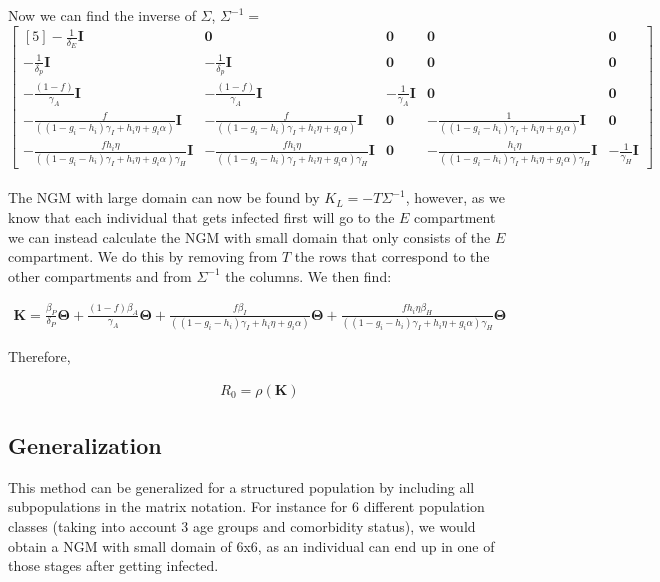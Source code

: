 \documentclass{article}
\begin{document}
Now we can find the inverse of $\Sigma$, $\Sigma^{-1} = $
\\
\noindent
\[
  \begin{bmatrix*} [5] 
   - \frac{1}{\delta_E} \boldsymbol{I} & \boldsymbol{0} & \boldsymbol{0} & \boldsymbol{0} & \boldsymbol{0} \\
   -\frac{1}{\delta_p} \boldsymbol{I} & -\frac{1}{\delta_p} \boldsymbol{I} & \boldsymbol{0} & \boldsymbol{0} & \boldsymbol{0} \\
   -\frac{(1-f)}{\gamma_A} \boldsymbol{I} & -\frac{(1-f)}{\gamma_A} \boldsymbol{I} & -\frac{1}{\gamma_A} \boldsymbol{I} & \boldsymbol{0} & \boldsymbol{0} \\
   -\frac{f}{((1-g_i-h_i) \gamma_{I} + h_i \eta + g_i \alpha)} \boldsymbol{I} & -\frac{f}{((1-g_i-h_i) \gamma_{I} + h_i \eta + g_i \alpha)} \boldsymbol{I} & \boldsymbol{0} & -\frac{1}{((1-g_i-h_i) \gamma_{I} + h_i \eta + g_i \alpha)} \boldsymbol{I} & \boldsymbol{0} \\
   -\frac{fh_i \eta}{((1-g_i-h_i) \gamma_{I} + h_i \eta + g_i \alpha)\gamma_H} \boldsymbol{I} & -\frac{fh_i \eta}{((1-g_i-h_i) \gamma_{I} + h_i \eta + g_i \alpha)\gamma_H} \boldsymbol{I} & \boldsymbol{0} & -\frac{h_i \eta}{((1-g_i-h_i) \gamma_{I} + h_i \eta + g_i \alpha)\gamma_H} \boldsymbol{I} & -\frac{1}{\gamma_H} \boldsymbol{I} 
   \end{bmatrix*}
\]
\\
The NGM with large domain can now be found by $K_L = - T \Sigma^{-1}$, however, as we know that each individual that gets infected first will go to the $E$ compartment we can instead calculate the NGM with small domain that only consists of the $E$ compartment.
We do this by removing from $T$ the rows that correspond to the other compartments and from $\Sigma^{-1}$ the columns. 
We then find: 

\begin{gather}
\boldsymbol{K} = \frac{\beta_P}{\delta_P} \boldsymbol{\Theta} + \frac{(1-f)\beta_A}{\gamma_A} \boldsymbol{\Theta} + \frac{f \beta_I}{((1-g_i-h_i) \gamma_{I} + h_i \eta + g_i \alpha)} \boldsymbol{\Theta} + \frac{fh_i \eta \beta_H}{((1-g_i-h_i) \gamma_{I} + h_i \eta + g_i \alpha)\gamma_H} \boldsymbol{\Theta}
\end{gather}

Therefore, 

\begin{gather}
R_0 = \rho(\boldsymbol{K})
\end{gather}

\subsection*{Generalization}

This method can be generalized for a structured population by including all subpopulations in the matrix notation. For instance for 6 different population classes (taking into account 3 age groups and comorbidity status), we would obtain a NGM with small domain of 6x6, as an individual can end up in one of those stages after getting infected. 
\end{document}
